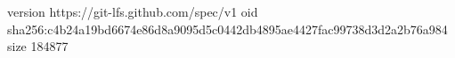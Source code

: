 version https://git-lfs.github.com/spec/v1
oid sha256:c4b24a19bd6674e86d8a9095d5c0442db4895ae4427fac99738d3d2a2b76a984
size 184877
